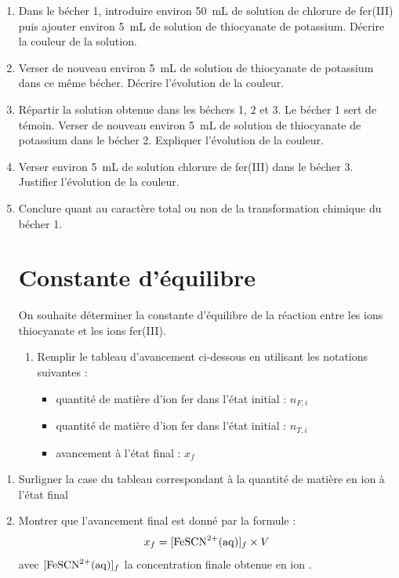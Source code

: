 \documentclass[a4paper,11pt,fleqn]{scrartcl}%
\begin{document}
\vspace{1em}
	\begin{enumerate}
	\item Dans le bécher 1, introduire environ \SI{50}{\milli \liter} de solution de chlorure de fer(III) puis ajouter environ \SI{5}{\milli \liter} de solution de thiocyanate de potassium. Décrire la couleur de la solution.
	\item Verser de nouveau environ \SI{5}{\milli \liter} de solution de thiocyanate de potassium dans ce même bécher. Décrire l'évolution de la couleur.
	\item Répartir la solution obtenue dans les béchers 1, 2 et 3. Le bécher 1 sert de témoin. Verser de nouveau environ \SI{5}{\milli \liter} de solution de thiocyanate de potassium dans le bécher 2. Expliquer l'évolution de la couleur.
	\item Verser environ \SI{5}{\milli \liter} de solution chlorure de fer(III) dans le bécher 3. Justifier l'évolution de la couleur.
	\item Conclure quant au caractère total ou non de la transformation chimique du bécher 1.
	\section{Constante d'équilibre}
On souhaite déterminer la constante d'équilibre de la réaction entre les ions thiocyanate et les ions fer(III).
\begin{enumerate}
	\item Remplir le tableau d'avancement ci-dessous en utilisant les notations suivantes :
	\begin{itemize}
		\item quantité de matière d'ion fer  dans l'état initial : $n_{F,i}$
		\item quantité de matière d'ion fer  dans l'état initial : $n_{T,i}$
		\item avancement à l'état final : $x_f$
	\end{itemize}
\end{enumerate}
\end{enumerate}
\begin{enumerate}[resume]
	\item Surligner la case du tableau correspondant à la quantité de matière en ion  à l'état final
	\item Montrer que l'avancement final est donné par la formule : $$x_f = [\ce{FeSCN^{2+}(aq)}]_f \times V$$ avec $[\ce{FeSCN^{2+}(aq)}]_f$ la concentration finale obtenue en ion .
\end{enumerate}
\end{document}
